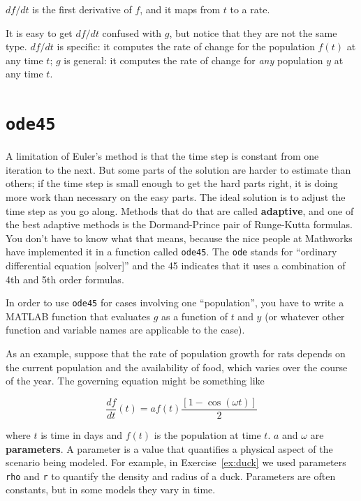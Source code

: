 \documentclass[
]{book}
\begin{document}
$df/dt$ is the first derivative of $f$, and it maps from $t$ to a
rate.  

It is easy to get $df/dt$ confused with $g$, but notice that they are
not the same type.
$df/dt$ is specific: it computes the rate of change for the
population $f(t)$ at any time $t$;
$g$ is general: it computes the rate
of change for \textit{any} population $y$ at any time $t$.


\section{{\tt ode45}}
\label{sect:ode45}

A limitation of Euler's method is that the time step is constant from
one iteration to the next.  But some parts of the solution are
harder to estimate than others; if the time step is small enough to
get the hard parts right, it is doing more work than necessary on the
easy parts.  The ideal solution is to adjust the time step as you go
along.  Methods that do that are called {\bf adaptive}, and one of the
best adaptive methods is the Dormand-Prince pair of Runge-Kutta
formulas.  You don't have to know what that means,
because the nice people at Mathworks have implemented it in a function
called {\tt ode45}.  The {\tt ode} stands for ``ordinary differential
equation [solver]'' and the 45 indicates that it uses a combination of
4th and 5th order formulas.

In order to use {\tt ode45} for cases involving one ``population'', 
you have to write a MATLAB function that evaluates $g$ as a function of
$t$ and $y$ (or whatever other function and variable names are applicable to the case).

As an example, suppose that the rate of population growth for rats
depends on the current population and the availability of food,
which varies over the course of the year.
The governing equation might be something like

\begin{equation}
\frac{df}{dt}(t) = a f(t) \frac{\left[1 - \cos (\omega t) \right]}{2}
\end{equation}

%
where $t$ is time in days and $f(t)$ is the population at time $t$.
$a$ and $\omega$ are {\bf parameters}.  A parameter is a value that
quantifies a physical aspect of the scenario being modeled.  For
example, in Exercise~\ref{ex:duck} we used parameters {\tt rho} and
{\tt r} to quantify the density and radius of a duck.  Parameters are
often constants, but in some models they vary in time.
\end{document}
